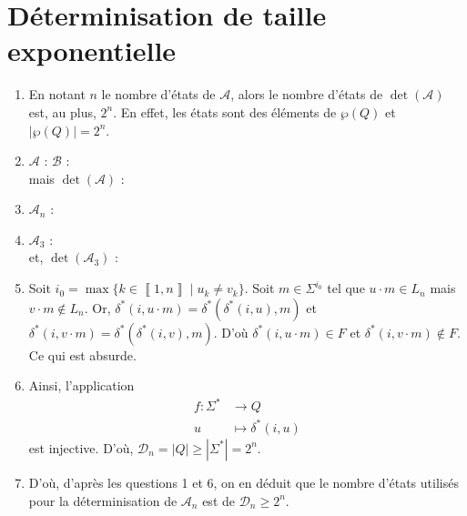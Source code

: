 \section{Déterminisation de taille exponentielle}

\begin{enumerate}
	\item En notant $n$\/ le nombre d'états de $\mathcal{A}$, alors le nombre d'états de $\det(\mathcal{A})$\/ est, au plus, $2^n$. En effet, les états sont des éléments de $\wp(Q)$\/ et $|\wp(Q)| = 2^n$.
	\item $\mathcal{A}$ :  $\mathcal{B}$ : \\
		mais $\det(\mathcal{A})$\/ : 
	\item $\mathcal{A}_n$\/ : 
	\item $\mathcal{A}_3$\/ : \\
		et, $\det(\mathcal{A}_3)$\/ : 
	\item Soit $i_0 = \max \{k \in \left\llbracket 1,n \right\rrbracket  \mid u_k \neq v_k\}$. Soit $m \in \Sigma^{i_0}$\/ tel que $u \cdot m \in L_n$\/ mais $v\cdot m \not\in L_n$. Or, $\delta^*(i, u\cdot m) = \delta^*(\delta^*(i,u), m)$\/ et $\delta^*(i,v\cdot m) = \delta^*(\delta^*(i,v),m)$. D'où $\delta^*(i,u\cdot m) \in F$\/ et $\delta^*(i,v\cdot m) \not\in F$. Ce qui est absurde.
	\item Ainsi, l'application \begin{align*}
			f: \Sigma^* &\longrightarrow Q \\
			u &\longmapsto \delta^*(i,u)
		\end{align*} est injective. D'où, $\mathcal{D}_n = |Q| \ge |\Sigma^*| = 2^n$.
	\item D'où, d'après les questions 1 et 6, on en déduit que le nombre d'états utilisés pour la déterminisation de $\mathcal{A}_n$\/ est de $\mathcal{D}_n \ge 2^n$.
\end{enumerate}
